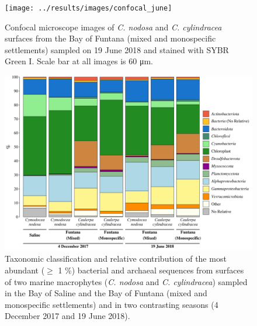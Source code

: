 \documentclass[12pt,]{article}
\begin{document}
\newpage
\begin{figure}[ht]

{\centering \texttt{[image: ../results/images/confocal\_june]} 

}

\caption{Confocal microscope images of \textit{C. nodosa} and \textit{C. cylindracea} surfaces from the Bay of Funtana (mixed and monospecific settlements) sampled on 19 June 2018 and stained with SYBR Green I. Scale bar at all images is 60 \si{\um}.\label{confocal_june}}\label{fig:unnamed-chunk-2}
\end{figure}

\newpage
\begin{figure}[ht]

{\centering \includegraphics[width=1\linewidth]{../results/figures/community_bar_plot} 

}

\caption{Taxonomic classification and relative contribution of the most abundant ($\geq$ 1 \si{\percent}) bacterial and archaeal sequences from surfaces of two marine macrophytes (\textit{C. nodosa} and \textit{C. cylindracea}) sampled in the Bay of Saline and the Bay of Funtana (mixed and monospecific settlements) and in two contrasting seasons (4 December 2017 and 19 June 2018).\label{community}}\label{fig:unnamed-chunk-3}
\end{figure}
\end{document}
